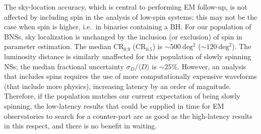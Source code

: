 The sky-location accuracy, which is central to performing EM follow-up, is not affected by including spin in the analysis of low-spin systems; this may not be the case when spin is higher, i.e.\ in binaries containing a BH. For our population of BNSs, sky localization is unchanged by the inclusion (or exclusion) of spin in parameter estimation. The median $\mathrm{CR}_{0.9}$ ($\mathrm{CR}_{0.5}$) is $\sim 500~\mathrm{deg^2}$ ($\sim 120~\mathrm{deg^2}$). The luminosity distance is similarly unaffected for this population of slowly spinning NSs; the median fractional uncertainty $\sigma_D/\langle D \rangle$ is $\sim 25\%$.  However, an analysis that includes spins requires the use of more computationally expensive waveforms (that include more physics), increasing latency by an order of magnitude.  Therefore, if the population matches our current expectation of being slowly spinning, the low-latency results that could be supplied in time for EM observatories to search for a counter-part are as good as the high-latency results in this respect, and there is no benefit in waiting.


  
  
  
  
  
  
  
  
  
  
  
  
  
  